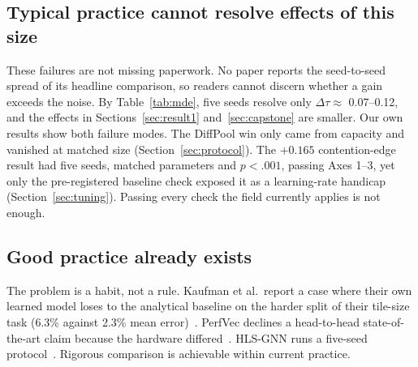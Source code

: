 \begin{table}[t]
\caption{Audit outcome by rigor axis for 20 papers that make a comparative architectural claim about a
learned performance or cost model (2018--2026). No paper passes Axes 1--3 together, and 17 of 20 fail
at least three of the five axes.}
\label{tab:audit}
\centering
\small

\end{table}

\subsection{Typical practice cannot resolve effects of this size}
\label{sec:audit-resolve}
These failures are not missing paperwork. No paper reports the seed-to-seed spread of its headline
comparison, so readers cannot discern whether a gain exceeds the noise. By Table~\ref{tab:mde}, five seeds
resolve only $\Delta\tau \approx$ 0.07--0.12, and the effects in Sections~\ref{sec:result1}
and~\ref{sec:capstone} are smaller. Our own results show both failure modes. The DiffPool win only came from
capacity and vanished at matched size (Section~\ref{sec:protocol}). The $+0.165$ contention-edge result
had five seeds, matched parameters and $p < .001$, passing Axes 1--3, yet only the pre-registered
baseline check exposed it as a learning-rate handicap (Section~\ref{sec:tuning}). Passing every check
the field currently applies is not enough.

\subsection{Good practice already exists}
\label{sec:audit-good}
The problem is a habit, not a rule. Kaufman et al.\ report a case where their own learned model loses to
the analytical baseline on the harder split of their tile-size task (6.3\% against 2.3\% mean
error)~\cite{kaufman2021learned}. PerfVec declines a head-to-head state-of-the-art claim because the
hardware differed~\cite{li2024learning}. HLS-GNN runs a five-seed protocol~\cite{wu2022highlevel}. Rigorous comparison is achievable within current practice.
